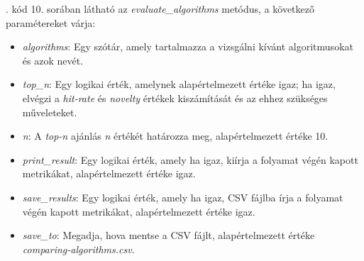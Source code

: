 \documentclass[
]{thesis-ekf}
\theoremstyle{definition}
\theoremstyle{remark}
\begin{document}


. kód 10. sorában látható az \emph{evaluate\_algorithms} metódus, a következő paramétereket várja:
\begin{itemize}
	\item \emph{algorithms}: Egy szótár, amely tartalmazza a vizsgálni kívánt algoritmusokat és azok nevét.
	\item \emph{top\_n}: Egy logikai érték, amelynek alapértelmezett értéke igaz; ha igaz, elvégzi a \emph{hit-rate} és \emph{novelty} értékek kiszámítását és az ehhez szükséges műveleteket.
	\item \emph{n}: A \emph{top-n} ajánlás \emph{n} értékét határozza meg, alapértelmezett értéke 10.
	\item \emph{print\_result}: Egy logikai érték, amely ha igaz, kiírja a folyamat végén kapott metrikákat, alapértelmezett értéke igaz.
	\item \emph{save\_results}: Egy logikai érték, amely ha igaz, CSV fájlba írja a folyamat végén kapott metrikákat, alapértelmezett értéke igaz.
	\item \emph{save\_to}: Megadja, hova mentse a CSV fájlt, alapértelmezett értéke \emph{comparing-algorithms.csv}.
\end{itemize}
\end{document}
